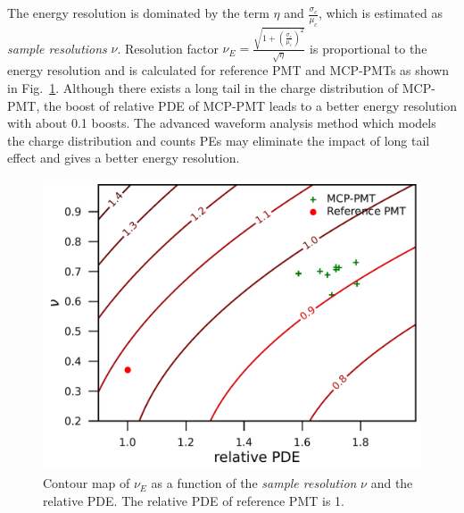 The energy resolution is dominated by the term $\eta$ and $\frac{\sigma_c}{\mu_c}$, which is estimated as \emph{sample resolutions} $\nu$. Resolution factor $\nu_{E}=\frac{\sqrt{1+(\frac{\sigma_c}{\mu_c})^2}}{\sqrt{\eta}}$ is proportional to the energy resolution and is calculated for reference PMT and MCP-PMTs as shown in Fig.~\ref{fig:EnergyResolution}. Although there exists a long tail in the charge distribution of MCP-PMT, the boost of relative PDE of MCP-PMT leads to a better energy resolution with about 0.1 boosts. The advanced waveform analysis method which models the charge distribution and counts PEs may eliminate the impact of long tail effect and gives a better energy resolution.
\begin{figure}[!htbp]
    \centering
    \includegraphics[width=\MF\textwidth]{figures/result/resolution.pdf}
    \caption{Contour map of $\nu_{E}$ as a function of the \emph{sample resolution} $\nu$ and the relative PDE. The relative PDE of reference PMT is 1.}
    \label{fig:EnergyResolution}
\end{figure}
